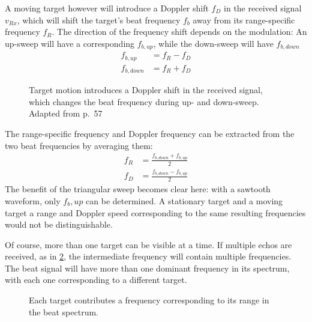 A moving target however will introduce a Doppler shift \(f_D\) in the
received signal \(v_{Rx}\), which will shift the target's beat frequency
\(f_b\) away from its range-specific frequency \(f_R\). The direction of
the frequency shift depends on the modulation: An up-sweep will have a
corresponding $f_{b,up}$, while the down-sweep will have $f_{b,down}$
\begin{align*}
	f_{b,up}    &= f_R - f_D \\
	f_{b,down}  &= f_R + f_D
\end{align*}

\begin{figure}[htp]
    \centering
    \def\svgwidth{10cm}
    
    \caption{\label{fig:fmcw_doppler}Target motion introduces a Doppler shift in the received signal, which changes the beat frequency during up- and down-sweep. Adapted from \cite{Adams2012} p.~57}
\end{figure}

The range-specific frequency and Doppler frequency can be extracted from the two beat frequencies by averaging them: 
\begin{align*}
	f_R &= \frac{f_{b,down} + f_{b,up}}{2} \\
    f_D &= \frac{f_{b,down} - f_{b,up}}{2}
\end{align*}
The benefit of the triangular sweep becomes clear here: with a sawtooth
waveform, only \(f_b,up\) can be determined. A stationary target and a
moving target a range and Doppler speed corresponding to the same
resulting frequencies would not be distinguishable.

Of course, more than one target can be visible at a time. If multiple
echos are received, as in \cref{fig:fmcw_multitarget}, the intermediate frequency will
contain multiple frequencies. The beat signal will have more than one
dominant frequency in its spectrum, with each one corresponding to a
different target.

\begin{figure}[htp]
    \centering
    \def\svgwidth{10cm}
    
    \caption{\label{fig:fmcw_multitarget}Each target contributes a frequency corresponding to its range in the beat spectrum.}
\end{figure}

